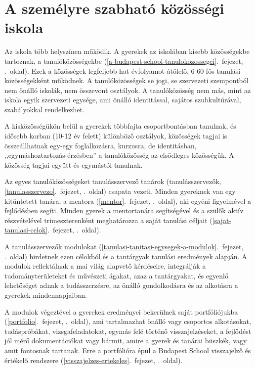 \hypertarget{a-szemelyre-szabhato-kozossegi-iskola}{%
\section{A személyre szabható közösségi
iskola}\label{a-szemelyre-szabhato-kozossegi-iskola}}

Az iskola több helyszínen működik. A gyerekek az iskolában kisebb
közösségekbe tartoznak, a
tanulóközösségekbe (\ref{a-budapest-school-tanulokozossegei}.~fejezet, \pageref{a-budapest-school-tanulokozossegei}.~oldal).
Ezek a közösségek legfeljebb hat évfolyamot átölelő, 6-60 fős tanulási
közösségekként működnek. A tanulóközösségek se jogi, se szervezeti
szempontból nem önálló iskolák, nem összevont osztályok. A
tanulóközösség nem más, mint az iskola egyik szervezeti egysége, ami
önálló identitással, sajátos szubkultúrával, szabályokkal rendelkezhet.

A kisközösségükön belül a gyerekek többfajta csoportbontásban tanulnak,
és idősebb korban (10-12 év felett) különböző osztályok, közösségek
tagjai is összeállhatnak egy-egy foglalkozásra, kurzusra, de
identitásban, ,,egymáshoztartozás-érzésben'' a tanulóközösség az
elsődleges közösségük. A közösség tagjai együtt és egymástól tanulnak.

Az egyes tanulóközösségeket
tanulásszervező tanárok (tanulásszervezők, \ref{tanulasszervezo}.~fejezet, \pageref{tanulasszervezo}.~oldal)
csapata vezeti. Minden gyereknek van egy kitüntetett tanára, a
mentora (\ref{mentor}.~fejezet, \pageref{mentor}.~oldal), aki egyéni
figyelmével a fejlődésben segíti. Minden gyerek a mentortanára
segítségével és a szülők aktív részvételével trimeszterenként
meghatározza a
saját tanulási céljait (\ref{sajat-tanulasi-celok}.~fejezet, \pageref{sajat-tanulasi-celok}.~oldal).

A tanulásszervezők
modulokat (\ref{tanulasi-tanitasi-egysegek-a-modulok}.~fejezet, \pageref{tanulasi-tanitasi-egysegek-a-modulok}.~oldal)
hirdetnek ezen célokból és a tantárgyak tanulási eredmények alapján. A
modulok reflektálnak a mai világ alapvető kérdéseire, integrálják a
tudományterületeket és művészeti ágakat, azaz a tantárgyakat, és egyenlő
lehetőséget adnak a tudásszerzésre, az önálló gondolkodásra és az
alkotásra a gyerekek mindennapjaiban.

A modulok végeztével a gyerekek eredményei bekerülnek saját
portfóliójukba (\ref{portfolio}.~fejezet, \pageref{portfolio}.~oldal),
ami tartalmazhat önálló vagy csoportos alkotásokat, tudáspróbákat,
vizsgafeladatokat, egymás felé történő visszajelzéseket, a fejlődést jól
mérő dokumentációkat vagy bármit, amire a gyerek és tanárai büszkék, vagy
amit fontosnak tartanak. Erre a portfólióra épül a Budapest School
visszajelző és értékelő rendszere (\ref{visszajelzes-ertekeles}.~fejezet, \pageref{visszajelzes-ertekeles}.~oldal).

